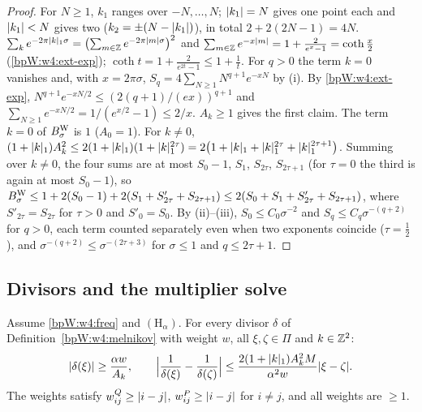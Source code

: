 \begin{proof}
\label{stepW:w4:count}
For $N\ge1$, $k_1$ ranges over $-N,\dots,N$; $\lvert k_1\rvert=N$ gives one point each and $\lvert k_1\rvert<N$ gives two
($k_2=\pm(N-\lvert k_1\rvert)$), in total $2+2(2N-1)=4N$.
\label{stepW:w4:coth}
$\sum_ke^{-2\pi\lvert k\rvert_1\sigma}=\bigl(\sum_{m\in\mathbb{Z}}e^{-2\pi\lvert m\rvert\sigma}\bigr)^2$ and
$\sum_{m\in\mathbb{Z}}e^{-x\lvert m\rvert}=1+\frac{2}{e^x-1}=\coth\frac x2$ (\ref{bpW:w4:ext-exp}); $\coth t=1+\frac2{e^{2t}-1}\le1+\frac1t$.
\label{stepW:w4:wsum}
For $q>0$ the term $k=0$ vanishes and, with $x=2\pi\sigma$, $S_q=4\sum_{N\ge1}N^{q+1}e^{-xN}$ by (i). By
\ref{bpW:w4:ext-exp}, $N^{q+1}e^{-xN/2}\le(2(q+1)/(ex))^{q+1}$ and $\sum_{N\ge1}e^{-xN/2}=1/(e^{x/2}-1)\le2/x$.
\label{stepW:w4:bw}
$A_k\ge1$ gives the first claim. The term $k=0$ of $B^{\rm W}_\sigma$ is $1$ ($A_0=1$). For $k\ne0$,
$(1+\lvert k\rvert_1)A_k^2\le2(1+\lvert k\rvert_1)(1+\lvert k\rvert_1^{2\tau})=2\bigl(1+\lvert k\rvert_1+\lvert k\rvert_1^{2\tau}+\lvert k\rvert_1^{2\tau+1}\bigr)$. Summing over
$k\ne0$, the four sums are at most $S_0-1$, $S_1$, $S_{2\tau}$, $S_{2\tau+1}$ (for $\tau=0$ the third is again at most
$S_0-1$), so $B^{\rm W}_\sigma\le1+2(S_0-1)+2(S_1+S'_{2\tau}+S_{2\tau+1})\le2(S_0+S_1+S'_{2\tau}+S_{2\tau+1})$, where
$S'_{2\tau}=S_{2\tau}$ for $\tau>0$ and $S'_0=S_0$. By (ii)--(iii), $S_0\le C_0\sigma^{-2}$ and $S_q\le C_q\sigma^{-(q+2)}$ for $q>0$,
each term counted separately even when two exponents coincide ($\tau=\frac12$), and
$\sigma^{-(q+2)}\le\sigma^{-(2\tau+3)}$ for $\sigma\le1$ and $q\le2\tau+1$.
\end{proof}

\subsection{Divisors and the multiplier solve}\label{bpW:w4:solve-sec}

\begin{lemma}\label{bpW:w4:divisors}
Assume \eqref{bpW:w4:freq} and $(\mathrm H_\alpha)$. For every divisor $\delta$ of Definition~\ref{bpW:w4:melnikov}
with weight $w$, all $\xi,\zeta\in\Pi$ and $k\in\mathbb{Z}^2$:
\[\lvert \delta(\xi)\rvert\ge\frac{\alpha w}{A_k},\qquad
\Bigl\lvert\frac1{\delta(\xi)}-\frac1{\delta(\zeta)}\Bigr\rvert\le\frac{2(1+\lvert k\rvert_1)A_k^2M}{\alpha^2w}\lvert \xi-\zeta\rvert.\]
The weights satisfy $w^Q_{ij}\ge\lvert i-j\rvert$, $w^P_{ij}\ge\lvert i-j\rvert$ for $i\ne j$, and all weights are $\ge1$.
\end{lemma}


